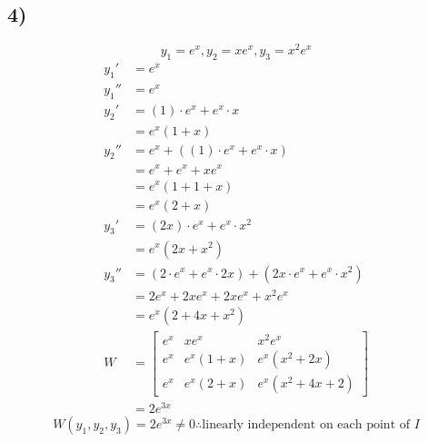 \documentclass{article}
\begin{document}
\subsection{4)}
$$ y_1 = e^x, y_2 = xe^x, y_3 = x^2e^x $$
\begin{align*}
	y_1' & = e^x \\
	y_1'' & = e^x \\
	y_2' & = (1) \cdot e^x + e^x \cdot x \\
		 & = e^x \left( 1 + x \right) \\
	y_2'' & = e^x + \left( (1) \cdot e^x + e^x \cdot x \right) \\
		  & = e^x + e^x + xe^x \\
		  & = e^x \left(1 + 1 + x\right) \\
		  & = e^x \left(2 + x\right) \\
	y_3' & = (2x) \cdot e^x + e^x \cdot x^2 \\
		 & = e^x \left( 2x + x^2 \right) \\
	y_3'' & = \left( 2 \cdot e^x + e^x \cdot 2x \right) + \left( 2x \cdot e^x + e^x \cdot x^2 \right) \\
		  & = 2e^x + 2xe^x + 2xe^x + x^2e^x \\
		  & = e^x \left( 2 + 4x + x^2 \right) \\
	W & = \begin{bmatrix}
		e^x & xe^x & x^2e^x \\
		e^x & e^x \left( 1 + x \right) & e^x \left(x^2 + 2x \right) \\
		e^x & e^x \left( 2 + x \right) & e^x \left( x^2 + 4x + 2 \right)
	\end{bmatrix} \\
	  & = 2e^{3x}
\end{align*}
\begin{equation*}
	\boxed{
		W(y_1,y_2,y_3) = 2e^{3x} \neq 0 \therefore \text{linearly independent on each point of } I
	}
\end{equation*}
\end{document}
